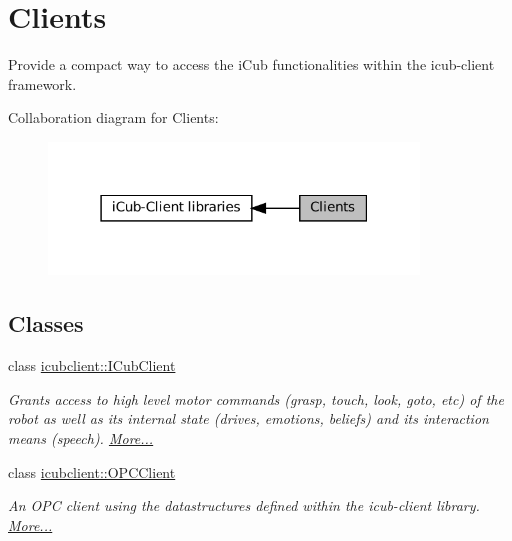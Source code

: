 \hypertarget{group__icubclient__clients}{}\section{Clients}
\label{group__icubclient__clients}


Provide a compact way to access the i\+Cub functionalities within the icub-\/client framework.  


Collaboration diagram for Clients\+:
\nopagebreak
\begin{figure}[H]
\begin{center}
\leavevmode
\includegraphics[width=279pt]{group__icubclient__clients}
\end{center}
\end{figure}
\subsection*{Classes}
\begin{DoxyCompactItemize}
\item 
class \hyperlink{group__icubclient__clients_classicubclient_1_1ICubClient}{icubclient\+::\+I\+Cub\+Client}
\begin{DoxyCompactList}\small\item\em Grants access to high level motor commands (grasp, touch, look, goto, etc) of the robot as well as its internal state (drives, emotions, beliefs) and its interaction means (speech).  \hyperlink{group__icubclient__clients_classicubclient_1_1ICubClient}{More...}\end{DoxyCompactList}\item 
class \hyperlink{group__icubclient__clients_classicubclient_1_1OPCClient}{icubclient\+::\+O\+P\+C\+Client}
\begin{DoxyCompactList}\small\item\em An O\+PC client using the datastructures defined within the icub-\/client library.  \hyperlink{group__icubclient__clients_classicubclient_1_1OPCClient}{More...}\end{DoxyCompactList}\end{DoxyCompactItemize}


